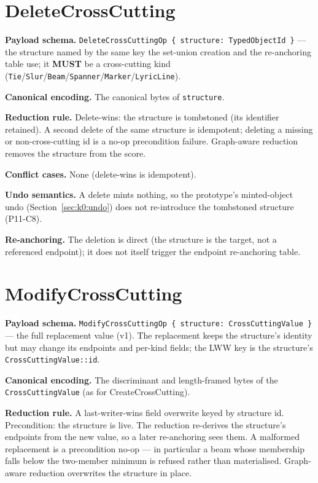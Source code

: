 \documentclass[11pt,letterpaper]{report}
\newcommand{\MUST}{\textbf{MUST}}
\begin{document}
\section{DeleteCrossCutting}
\label{sec:k0:delete-cross-cutting}

\textbf{Payload schema.} \texttt{DeleteCrossCuttingOp \{ structure: TypedObjectId
\}} --- the structure named by the same key the set-union creation and the
re-anchoring table use; it \MUST{} be a cross-cutting kind
(\texttt{Tie}/\texttt{Slur}/\texttt{Beam}/\texttt{Spanner}/\texttt{Marker}/\texttt{LyricLine}).

\textbf{Canonical encoding.} The canonical bytes of \texttt{structure}.

\textbf{Reduction rule.} Delete-wins: the structure is tombstoned (its identifier
retained). A second delete of the same structure is idempotent; deleting a
missing or non-cross-cutting id is a no-op precondition failure. Graph-aware
reduction removes the structure from the score.

\textbf{Conflict cases.} None (delete-wins is idempotent).

\textbf{Undo semantics.} A delete mints nothing, so the prototype's minted-object
undo (Section~\ref{sec:k0:undo}) does not re-introduce the tombstoned structure
(P11-C8).

\textbf{Re-anchoring.} The deletion is direct (the structure is the target, not a
referenced endpoint); it does not itself trigger the endpoint re-anchoring table.

\section{ModifyCrossCutting}
\label{sec:k0:modify-cross-cutting}

\textbf{Payload schema.} \texttt{ModifyCrossCuttingOp \{ structure:
CrossCuttingValue \}} --- the full replacement value (v1). The replacement keeps
the structure's identity but may change its endpoints and per-kind fields; the
LWW key is the structure's \texttt{CrossCuttingValue::id}.

\textbf{Canonical encoding.} The discriminant and length-framed bytes of the
\texttt{CrossCuttingValue} (as for CreateCrossCutting).

\textbf{Reduction rule.} A last-writer-wins field overwrite keyed by structure
id. Precondition: the structure is live. The reduction re-derives the structure's
endpoints from the new value, so a later re-anchoring sees them. A malformed
replacement is a precondition no-op --- in particular a beam whose membership
falls below the two-member minimum is refused rather than materialised.
Graph-aware reduction overwrites the structure in place.
\end{document}
